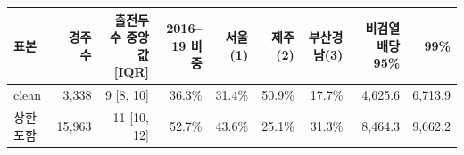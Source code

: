 \begin{tabular}{lrrrrrrrr}
\toprule
표본 & 경주 수 & 출전두수 중앙값 [IQR] & 2016--19 비중 & 서울(1) & 제주(2) & 부산경남(3) & 비검열 배당 95\% & 99\% \\
\midrule
clean & 3,338 & 9 [8, 10] & 36.3\% & 31.4\% & 50.9\% & 17.7\% & 4,625.6 & 6,713.9 \\
상한 포함 & 15,963 & 11 [10, 12] & 52.7\% & 43.6\% & 25.1\% & 31.3\% & 8,464.3 & 9,662.2 \\
\bottomrule
\end{tabular}
